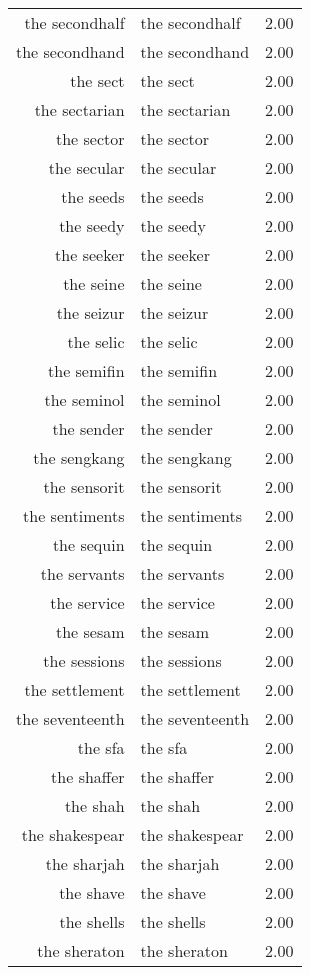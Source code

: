 \begin{table}[ht]
\begin{tabular}{rlr}
  the secondhalf & the secondhalf & 2.00 \\ 
  the secondhand & the secondhand & 2.00 \\ 
  the sect & the sect & 2.00 \\ 
  the sectarian & the sectarian & 2.00 \\ 
  the sector & the sector & 2.00 \\ 
  the secular & the secular & 2.00 \\ 
  the seeds & the seeds & 2.00 \\ 
  the seedy & the seedy & 2.00 \\ 
  the seeker & the seeker & 2.00 \\ 
  the seine & the seine & 2.00 \\ 
  the seizur & the seizur & 2.00 \\ 
  the selic & the selic & 2.00 \\ 
  the semifin & the semifin & 2.00 \\ 
  the seminol & the seminol & 2.00 \\ 
  the sender & the sender & 2.00 \\ 
  the sengkang & the sengkang & 2.00 \\ 
  the sensorit & the sensorit & 2.00 \\ 
  the sentiments & the sentiments & 2.00 \\ 
  the sequin & the sequin & 2.00 \\ 
  the servants & the servants & 2.00 \\ 
  the service & the service & 2.00 \\ 
  the sesam & the sesam & 2.00 \\ 
  the sessions & the sessions & 2.00 \\ 
  the settlement & the settlement & 2.00 \\ 
  the seventeenth & the seventeenth & 2.00 \\ 
  the sfa & the sfa & 2.00 \\ 
  the shaffer & the shaffer & 2.00 \\ 
  the shah & the shah & 2.00 \\ 
  the shakespear & the shakespear & 2.00 \\ 
  the sharjah & the sharjah & 2.00 \\ 
  the shave & the shave & 2.00 \\ 
  the shells & the shells & 2.00 \\ 
  the sheraton & the sheraton & 2.00 \\ 

\end{tabular}
\end{table}
